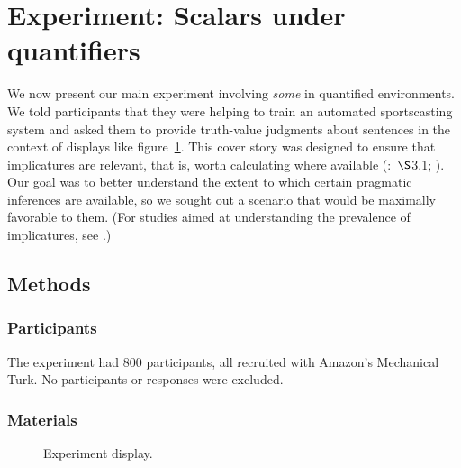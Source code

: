 \documentclass[leqno,12pt]{article}
\newcommand{\figref}[1]{figure~\ref{#1}}
\newcommand{\seccitealt}[2]{\citealt{#1}:~$\S$#2}
\newcommand{\word}[1]{\emph{#1}}
\begin{document}
{\section{Experiment: Scalars under quantifiers}\label{sec:binary}

We now present our main experiment involving \word{some} in quantified
environments. We told participants that they were helping to train an
automated sportscasting system and asked them to provide truth-value
judgments about sentences in the context of displays like
\figref{fig:binary:materials}. This cover story was designed to ensure
that implicatures are relevant, that is, worth calculating where
available (\seccitealt{Chemla:Spector:2011}{3.1};
\citealt{Clifton:Dube:2010}). Our goal was to better understand the
extent to which certain pragmatic inferences are available, so we
sought out a scenario that would be maximally favorable to them. (For
studies aimed at understanding the prevalence of implicatures, see
\citealt{Paris:1973,Hendriks-etal:2009,Degen:2015}.)



\subsection{Methods}

\subsubsection{Participants}

The experiment had 800 participants, all recruited with Amazon's
Mechanical Turk. No participants or responses were excluded.

\subsubsection{Materials}

\begin{figure}[t]
  \centering
  \caption{Experiment display.}
  \label{fig:binary:materials}
\end{figure}

}
\end{document}
